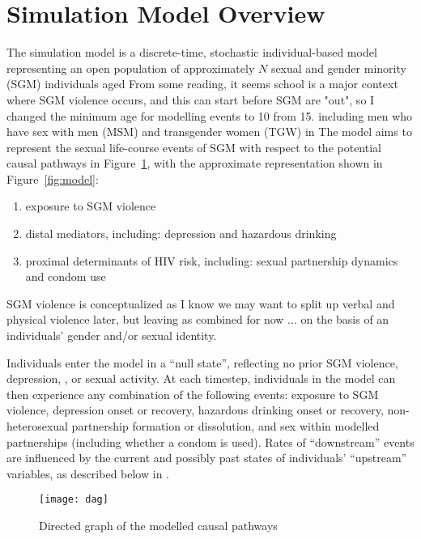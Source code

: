 \section{Simulation Model Overview}\label{mod.ov}
The simulation model is a discrete-time, stochastic individual-based model
representing an open population
of approximately $N$ sexual and gender minority (SGM) individuals aged
     {From some reading, it seems school is a major context where SGM violence occurs,
      and this can start before SGM are "out",
      so I changed the minimum age for modelling events to 10 from 15.}
including men who have sex with men (MSM) and transgender women (TGW) in
The model aims to represent the sexual life-course events of SGM with respect to
the potential causal pathways in Figure~\ref{fig:dag},
with the approximate representation shown in Figure~\ref{fig:model}:
\begin{enumerate}[label=\roman*)]
  \item exposure to SGM violence
  \item distal mediators, including:
        depression and hazardous drinking
  \item proximal determinants of HIV risk, including:
        sexual partnership dynamics and condom use
\end{enumerate}
SGM violence is conceptualized as
     {I know we may want to split up verbal and physical violence later,
      but leaving as combined for now ...}
on the basis of an individuals' gender and/or sexual identity.
\par
Individuals enter the model in a ``null state'', reflecting
no prior SGM violence, depression, \hazdrink, or sexual activity.
At each timestep, individuals in the model can then experience
any combination of the following events:
exposure to SGM violence,
depression onset or recovery,
hazardous drinking onset or recovery,
non-heterosexual partnership formation or dissolution,
and sex within modelled partnerships (including whether a condom is used).
Rates of ``downstream'' events are influenced by
the current and possibly past states of individuals' ``upstream'' variables,
as described below in .
\begin{figure}[b]
  \centering\texttt{[image: dag]}
  \caption{Directed graph of the modelled causal pathways}
  \label{fig:dag}
\end{figure}
